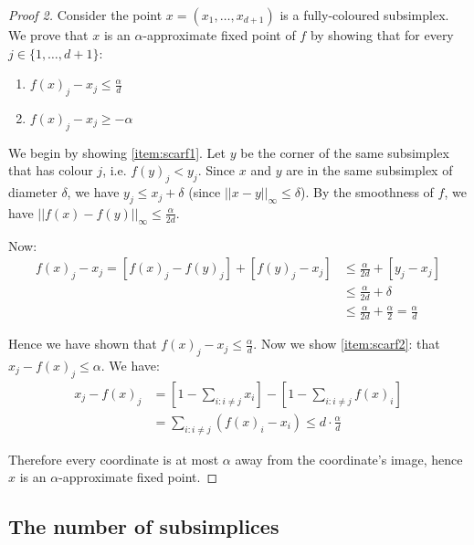 \begin{proof}[Proof 2]
	Consider the point $x=(x_1,\ldots,x_{d+1})$ is a fully-coloured subsimplex.
	We prove that $x$ is an $\alpha$-approximate fixed point of $f$ by showing
	that for every $j \in \{1,\ldots,d+1\}$:
	\begin{enumerate}[label=\arabic*),ref=(\arabic*)]
		\item $f(x)_j - x_j \le \frac{\alpha}{d}$ \label{item:scarf1}
		\item $f(x)_j - x_j \ge -\alpha$ \label{item:scarf2}
	\end{enumerate}

	We begin by showing \ref{item:scarf1}. Let $y$ be the corner of the same
	subsimplex that has colour $j$, i.e. $f(y)_j < y_j$. Since $x$ and $y$ are
	in the same subsimplex of diameter $\delta$, we have $y_j \le x_j +
	\delta$ (since $||x-y||_\infty \le \delta$). By the smoothness of $f$, we
	have $||f(x)-f(y)||_\infty \le \frac{\alpha}{2d}$.

	Now:
	\begin{equation*}
		\begin{split}
			f(x)_j - x_j = [ f(x)_j - f(y)_j ] + [f(y)_j - x_j] & \le
			\frac{\alpha}{2d} + [ y_j - x_j ] \\
			& \le \frac{\alpha}{2d} + \delta \\
			& \le \frac{\alpha}{2d} + \frac{\alpha}{2} = \frac{\alpha}{d}
		\end{split}
	\end{equation*}

	Hence we have shown that $f(x)_j - x_j \le \frac{\alpha}{d}$. Now we show
	\ref{item:scarf2}: that $x_j - f(x)_j \le \alpha$. We have:
	\begin{equation*}
		\begin{split}
			x_j - f(x)_j & = [ 1 - \sum_{i:i\neq j} x_i ] - [ 1 - \sum_{i:i\neq
			j} f(x)_i ] \\
			& = \sum_{i: i \neq j} (f(x)_i - x_i) \le d \cdot \frac{\alpha}{d}
		\end{split}
	\end{equation*}

	Therefore every coordinate is at most $\alpha$ away from the coordinate's
	image, hence $x$ is an $\alpha$-approximate fixed point.
\end{proof}

\subsection{The number of subsimplices}

